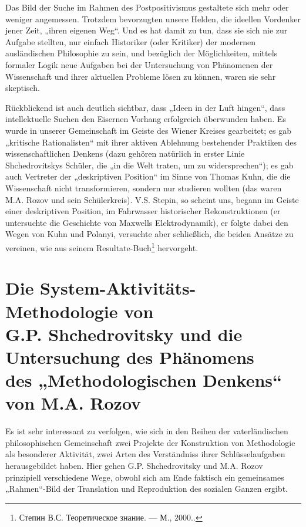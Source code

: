 \documentclass[11pt,a4paper]{article}
\begin{document}
Das Bild der Suche im Rahmen des Postpositivismus gestaltete sich mehr oder
weniger angemessen.  Trotzdem bevorzugten unsere Helden, die ideellen
Vordenker jener Zeit, „ihren eigenen Weg“. Und es hat damit zu tun, dass sie
sich nie zur Aufgabe stellten, nur einfach Historiker (oder Kritiker) der
modernen ausländischen Philosophie zu sein, und bezüglich der Möglichkeiten,
mittels formaler Logik neue Aufgaben bei der Untersuchung von Phänomenen der
Wissenschaft und ihrer aktuellen Probleme lösen zu können, waren sie sehr
skeptisch.

Rückblickend ist auch deutlich sichtbar, dass „Ideen in der Luft hingen“, dass
intellektuelle Suchen den Eisernen Vorhang erfolgreich überwunden haben. Es
wurde in unserer Gemeinschaft im Geiste des Wiener Kreises gearbeitet; es gab
„kritische Rationalisten“ mit ihrer aktiven Ablehnung bestehender Praktiken
des wissenschaftlichen Denkens (dazu gehören natürlich in erster Linie
Shchedrovitskys Schüler, die „in die Welt traten, um zu widersprechen“); es
gab auch Vertreter der „deskriptiven Position“ im Sinne von Thomas Kuhn, die
die Wissenschaft nicht transformieren, sondern nur studieren wollten (das
waren M.A. Rozov und sein Schülerkreis). V.S. Stepin, so scheint uns, begann
im Geiste einer deskriptiven Position, im Fahrwasser historischer
Rekonstruktionen (er untersuchte die Geschichte von Maxwells Elektrodynamik),
er folgte dabei den Wegen von Kuhn und Polanyi, versuchte aber schließlich,
die beiden Ansätze zu vereinen, wie aus seinem
Resultate-Buch\footnote{\foreignlanguage{russian}{Степин В.С. Теоретическое
    знание. — М., 2000.}.} hervorgeht.

\section{Die System-Aktivitäts-Methodologie von\\
  G.P. Shchedrovitsky und die Untersuchung des Phänomens\\ des
  „Methodologischen Denkens“ von M.A. Rozov}

Es ist sehr interessant zu verfolgen, wie sich in den Reihen der
vaterländischen philosophischen Gemeinschaft zwei Projekte der Konstruktion
von Methodologie als besonderer Aktivität, zwei Arten des Verständniss ihrer
Schlüsselaufgaben herausgebildet haben.  Hier gehen G.P. Shchedrovitsky und
M.A. Rozov prinzipiell verschiedene Wege, obwohl sich am Ende faktisch ein
gemeinsames „Rahmen“-Bild der Translation und Reproduktion des sozialen Ganzen
ergibt.
\end{document}
